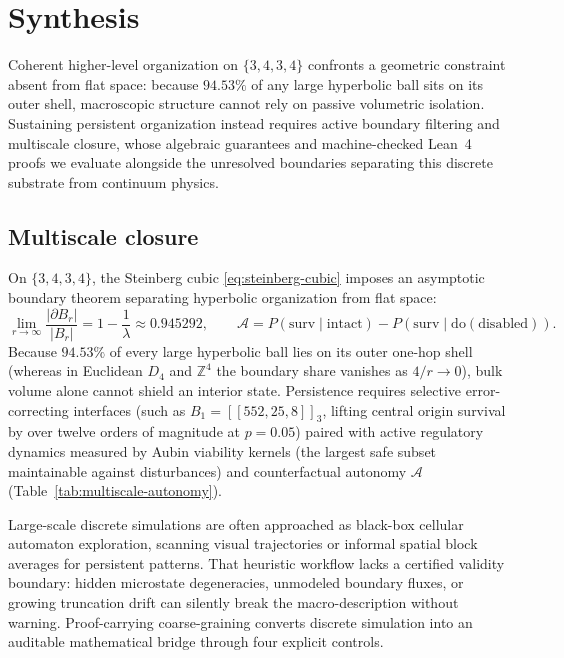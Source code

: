 \section{Synthesis}
\label{sec:lean-and-open}

Coherent higher-level organization on $\{3,4,3,4\}$ confronts a geometric constraint absent from flat space: because
$94.53\%$ of any large hyperbolic ball sits on its outer shell, macroscopic structure cannot rely on passive volumetric
isolation. Sustaining persistent organization instead requires active boundary filtering and multiscale closure, whose
algebraic guarantees and machine-checked Lean~4 proofs we evaluate alongside the unresolved boundaries separating this
discrete substrate from continuum physics.

\subsection{Multiscale closure}

On $\{3,4,3,4\}$, the Steinberg cubic \eqref{eq:steinberg-cubic} imposes an asymptotic boundary theorem separating
hyperbolic organization from flat space:
\begin{equation}
\lim_{r \to \infty} \frac{|\partial B_r|}{|B_r|} = 1 - \frac{1}{\lambda} \approx 0.945292,
\qquad
\mathcal{A} = P(\mathrm{surv} \mid \mathrm{intact}) - P(\mathrm{surv} \mid \mathrm{do}(\mathrm{disabled})).
\label{eq:boundary-autonomy}
\end{equation}
Because $94.53\%$ of every large hyperbolic ball lies on its outer one-hop shell (whereas in Euclidean $D_4$ and
$\mathbb{Z}^4$ the boundary share vanishes as $4/r \to 0$), bulk volume alone cannot shield an interior state.
Persistence requires selective error-correcting interfaces (such as $B_1 = [[552, 25, 8]]_3$, lifting central origin
survival by over twelve orders of magnitude at $p = 0.05$) paired with active regulatory dynamics measured by Aubin
viability kernels \cite{aubin1991} (the largest safe subset maintainable against disturbances) and counterfactual
autonomy $\mathcal{A}$ (Table~\ref{tab:multiscale-autonomy}).

Large-scale discrete simulations are often approached as black-box cellular automaton exploration, scanning visual
trajectories or informal spatial block averages for persistent patterns. That heuristic workflow lacks a certified
validity boundary: hidden microstate degeneracies, unmodeled boundary fluxes, or growing truncation drift can silently
break the macro-description without warning. Proof-carrying coarse-graining converts discrete simulation into an
auditable mathematical bridge through four explicit controls.

